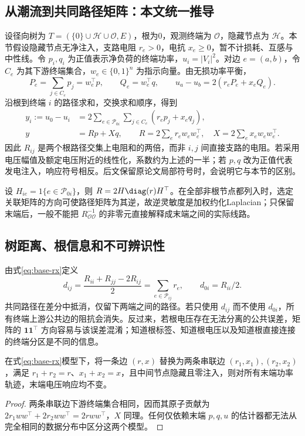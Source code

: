 \subsection{从潮流到共同路径矩阵：本文统一推导}
设径向树为 $T=(\{0\}\cup\mathcal H\cup\mathcal O,E)$，根为0，观测终端为 $\mathcal O$，隐藏节点为 $\mathcal H$。本节假设隐藏节点无净注入，支路电阻 $r_e>0$，电抗 $x_e\geq0$，暂不计损耗、互感与中性线。令 $p_i,q_i$ 为正值表示净负荷的终端功率，$u_i=|V_i|^2$。对边 $e=(a,b)$，令 $C_e$ 为其下游终端集合，$w_e\in\{0,1\}^n$ 为指示向量。由无损功率平衡，
\begin{equation}
 P_e=\sum_{j\in C_e}p_j=w_e^\top p,\qquad Q_e=w_e^\top q,
 \qquad u_a-u_b=2(r_eP_e+x_eQ_e).
\end{equation}
沿根到终端 $i$ 的路径求和，交换求和顺序，得到
\begin{align}
 y_i:=u_0-u_i
 &=2\sum_{e\in\mathcal P_{0i}}\sum_{j\in C_e}(r_ep_j+x_eq_j),\\
 y&=Rp+Xq,\qquad
 R=2\sum_e r_ew_ew_e^\top,\quad X=2\sum_e x_ew_ew_e^\top.
 \label{eq:base-rx}
\end{align}
因此 $R_{ij}$ 是两个根路径交集上电阻和的两倍，而非 $i,j$ 间直接支路的电阻。若采用电压幅值及额定电压附近的线性化，系数约为上述的一半；若 $p,q$ 改为正值代表发电注入，响应符号相反。后文保留原论文局部符号时，会说明它与本节的区别。

设 $H_{ie}=1\{e\in\mathcal P_{0i}\}$，则 $R=2H\diag(r)H^\top$。在全部非根节点都列入时，选定关联矩阵的方向可使路径矩阵为其逆，故逆灵敏度是加权约化Laplacian；只保留末端后，一般不能把 $R_{\mathcal O\mathcal O}^{-1}$ 的非零元直接解释成末端之间的实际线路。

\subsection{树距离、根信息和不可辨识性}
由式\eqref{eq:base-rx}定义
\begin{equation}
 d_{ij}=\frac{R_{ii}+R_{jj}-2R_{ij}}{2}
       =\sum_{e\in\mathcal P_{ij}}r_e,
 \qquad d_{0i}=R_{ii}/2.
 \label{eq:base-distance}
\end{equation}
共同路径在差分中抵消，仅留下两端之间的路径。若只使用 $d_{ij}$ 而不使用 $d_{0i}$，所有终端上游公共边的阻抗会消失。反过来，若根电压存在无法分离的公共误差，矩阵的 $\mathbf1\mathbf1^\top$ 方向容易与该误差混淆；知道根标签、知道根电压以及知道根直接连接的终端分区是不同的信息。

\begin{proposition}
在式\eqref{eq:base-rx}模型下，将一条边 $(r,x)$ 替换为两条串联边 $(r_1,x_1),(r_2,x_2)$，满足 $r_1+r_2=r$、$x_1+x_2=x$，且中间节点隐藏且零注入，则对所有末端功率轨迹，末端电压响应均不变。
\end{proposition}
\begin{proof}
两条串联边下游终端集合相同，因而其原子贡献为
$2r_1ww^\top+2r_2ww^\top=2rww^\top$，$X$ 同理。任何仅依赖末端 $p,q,u$ 的估计器都无法从完全相同的数据分布中区分这两个模型。
\end{proof}

